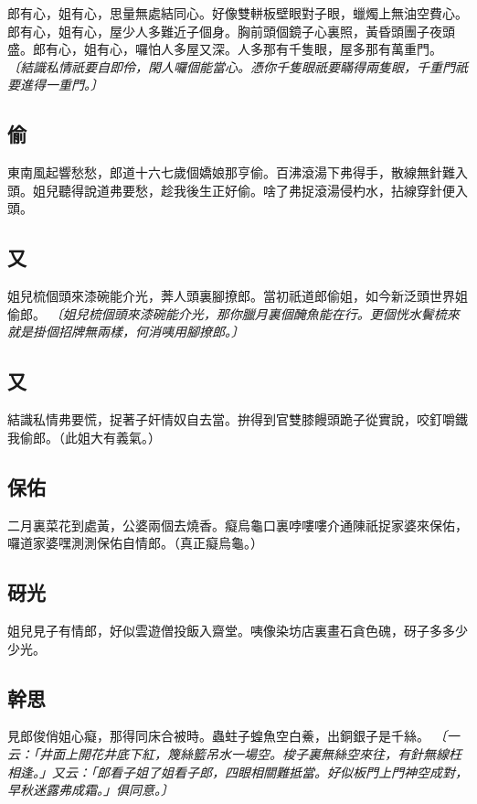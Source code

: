 郎有心，姐有心，思量無處結同心。好像雙軿板壁眼對子眼，蠟燭上無油空費心。郎有心，姐有心，屋少人多難近子個身。胸前頭個鏡子心裏照，黃昏頭團子夜頭盛。郎有心，姐有心，囉怕人多屋又深。人多那有千隻眼，屋多那有萬重門。
\textit{〔結識私情祇要自即伶，閑人囉個能當心。憑你千隻眼祇要瞞得兩隻眼，千重門祇要進得一重門。〕}

\subsection*{偷}

東南風起響愁愁，郎道十六七歲個嬌娘那亨偷。百沸滾湯下弗得手，散線無針難入頭。姐兒聽得說道弗要愁，趁我後生正好偷。啥了弗捉滾湯侵杓水，拈線穿針便入頭。

\subsection*{又}

姐兒梳個頭來漆碗能介光，莾人頭裏腳撩郎。當初祇道郎偷姐，如今新泛頭世界姐偷郎。
\textit{〔姐兒梳個頭來漆碗能介光，那你臘月裏個醃魚能在行。更個恍水鬢梳來就是掛個招牌無兩樣，何消咦用腳撩郎。〕}

\subsection*{又}

結識私情弗要慌，捉著子奸情奴自去當。拚得到官雙膝饅頭跪子從實說，咬釘嚼鐵我偷郎。（此姐大有義氣。）

\subsection*{保佑}

二月裏菜花到處黃，公婆兩個去燒香。癡烏龜口裏哱嘍嘍介通陳祇捉家婆來保佑，囉道家婆嘿測測保佑自情郎。（真正癡烏龜。）

\subsection*{砑光}

姐兒見子有情郎，好似雲遊僧投飯入齋堂。咦像染坊店裏畫石貪色磈，砑子多多少少光。

\subsection*{幹思}

見郎俊俏姐心癡，那得同床合被時。蟲蛀子蝗魚空白鯗，出銅銀子是千絲。
\textit{〔一云：「井面上開花井底下紅，篾絲籃吊水一場空。梭子裏無絲空來往，有針無線枉相逢。」又云：「郎看子姐了姐看子郎，四眼相關難抵當。好似板門上門神空成對，早秋迷露弗成霜。」俱同意。〕}

